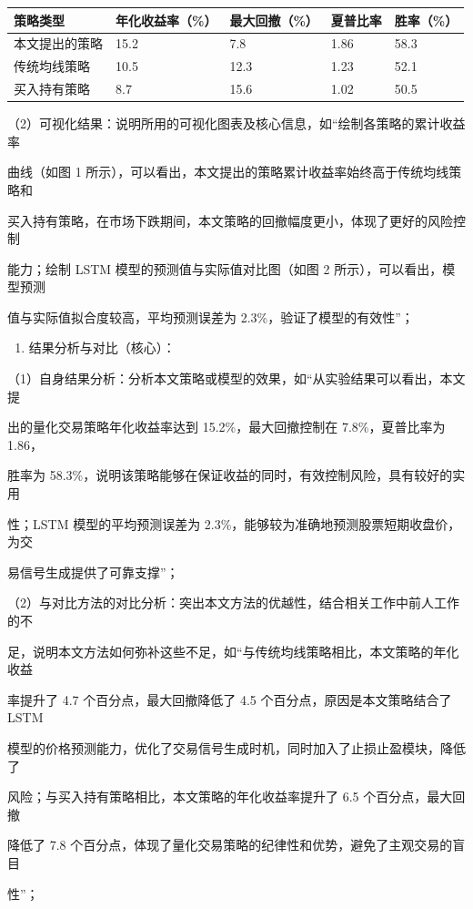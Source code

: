 \documentclass[
]{article}
\providecommand{\tightlist}{%
  \setlength{\itemsep}{0pt}\setlength{\parskip}{0pt}}
\begin{document}
\begin{longtable}[]{@{}lllll@{}}
\toprule
策略类型 & 年化收益率（\%） & 最大回撤（\%） & 夏普比率 &
胜率（\%）\tabularnewline
\midrule
\endhead
本文提出的策略 & 15.2 & 7.8 & 1.86 & 58.3\tabularnewline
传统均线策略 & 10.5 & 12.3 & 1.23 & 52.1\tabularnewline
买入持有策略 & 8.7 & 15.6 & 1.02 & 50.5\tabularnewline
\bottomrule
\end{longtable}

（2）可视化结果：说明所用的可视化图表及核心信息，如``绘制各策略的累计收益率

曲线（如图 1
所示），可以看出，本文提出的策略累计收益率始终高于传统均线策略和

买入持有策略，在市场下跌期间，本文策略的回撤幅度更小，体现了更好的风险控制

能力；绘制 LSTM 模型的预测值与实际值对比图（如图 2
所示），可以看出，模型预测

值与实际值拟合度较高，平均预测误差为 2.3\%，验证了模型的有效性''；

\begin{enumerate}
\def\labelenumi{\arabic{enumi}.}
\setcounter{enumi}{4}
\tightlist
\item
  结果分析与对比（核心）：
\end{enumerate}

（1）自身结果分析：分析本文策略或模型的效果，如``从实验结果可以看出，本文提

出的量化交易策略年化收益率达到 15.2\%，最大回撤控制在 7.8\%，夏普比率为
1.86，

胜率为
58.3\%，说明该策略能够在保证收益的同时，有效控制风险，具有较好的实用

性；LSTM 模型的平均预测误差为
2.3\%，能够较为准确地预测股票短期收盘价，为交

易信号生成提供了可靠支撑''；

（2）与对比方法的对比分析：突出本文方法的优越性，结合相关工作中前人工作的不

足，说明本文方法如何弥补这些不足，如``与传统均线策略相比，本文策略的年化收益

率提升了 4.7 个百分点，最大回撤降低了 4.5 个百分点，原因是本文策略结合了
LSTM

模型的价格预测能力，优化了交易信号生成时机，同时加入了止损止盈模块，降低了

风险；与买入持有策略相比，本文策略的年化收益率提升了 6.5
个百分点，最大回撤

降低了 7.8
个百分点，体现了量化交易策略的纪律性和优势，避免了主观交易的盲目

性''；
\end{document}
